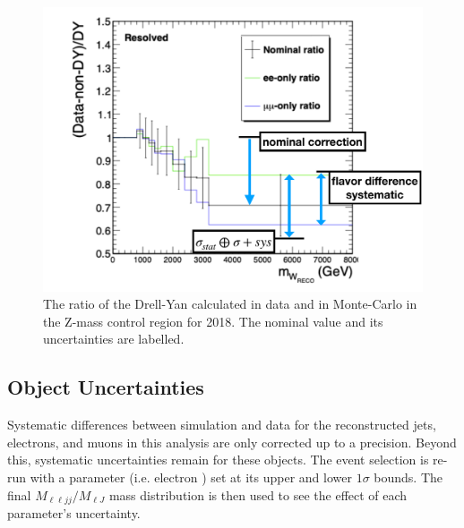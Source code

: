 \begin{figure}[!tp]

  \includegraphics[width=\textwidth]{figures/DYCR_ratio.pdf}

  \caption[Drell-Yan Shape Correction]{
    The ratio of the Drell-Yan calculated in data and in Monte-Carlo in the Z-mass control region for 2018. The nominal value and its uncertainties are labelled.
  }
  \label{fig:DYCR_ratio}
\end{figure}



\subsection{Object Uncertainties}
Systematic differences between simulation and data for the reconstructed jets, electrons, and muons in this analysis are only corrected up to a precision. Beyond this, systematic uncertainties remain for these objects. The event selection is re-run with a parameter (i.e. electron \pt) set at its upper and lower $1\sigma$ bounds. The final $M_{\ell\ell jj}/M_{\ell J}$ mass distribution is then used to see the effect of each parameter's uncertainty.

